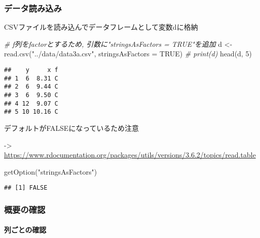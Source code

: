 \documentclass[
]{article}
\newenvironment{Shaded}{\begin{snugshade}}{\end{snugshade}}
\newcommand{\AttributeTok}[1]{\textcolor[rgb]{0.77,0.63,0.00}{#1}}
\newcommand{\CommentTok}[1]{\textcolor[rgb]{0.56,0.35,0.01}{\textit{#1}}}
\newcommand{\ConstantTok}[1]{\textcolor[rgb]{0.00,0.00,0.00}{#1}}
\newcommand{\DecValTok}[1]{\textcolor[rgb]{0.00,0.00,0.81}{#1}}
\newcommand{\FunctionTok}[1]{\textcolor[rgb]{0.00,0.00,0.00}{#1}}
\newcommand{\NormalTok}[1]{#1}
\newcommand{\OtherTok}[1]{\textcolor[rgb]{0.56,0.35,0.01}{#1}}
\newcommand{\StringTok}[1]{\textcolor[rgb]{0.31,0.60,0.02}{#1}}
\begin{document}
\hypertarget{ux30c7ux30fcux30bfux8aadux307fux8fbcux307f}{%
\subsubsection{データ読み込み}\label{ux30c7ux30fcux30bfux8aadux307fux8fbcux307f}}

CSVファイルを読み込んでデータフレームとして変数dに格納

\begin{Shaded}
\begin{Highlighting}[]
\CommentTok{\# f列をfactorとするため, 引数に"stringsAsFactors = TRUE"を追加}
\NormalTok{d }\OtherTok{\textless{}{-}} \FunctionTok{read.csv}\NormalTok{(}\StringTok{"../data/data3a.csv"}\NormalTok{, }\AttributeTok{stringsAsFactors =} \ConstantTok{TRUE}\NormalTok{)}
\CommentTok{\# print(d)}
\FunctionTok{head}\NormalTok{(d, }\DecValTok{5}\NormalTok{)}
\end{Highlighting}
\end{Shaded}

\begin{verbatim}
##    y     x f
## 1  6  8.31 C
## 2  6  9.44 C
## 3  6  9.50 C
## 4 12  9.07 C
## 5 10 10.16 C
\end{verbatim}

デフォルトがFALSEになっているため注意

-\textgreater{}
\url{https://www.rdocumentation.org/packages/utils/versions/3.6.2/topics/read.table}

\begin{Shaded}
\begin{Highlighting}[]
\FunctionTok{getOption}\NormalTok{(}\StringTok{"stringsAsFactors"}\NormalTok{) }
\end{Highlighting}
\end{Shaded}

\begin{verbatim}
## [1] FALSE
\end{verbatim}

\hypertarget{ux6982ux8981ux306eux78baux8a8d}{%
\subsubsection{概要の確認}\label{ux6982ux8981ux306eux78baux8a8d}}

\hypertarget{ux5217ux3054ux3068ux306eux78baux8a8d}{%
\paragraph{列ごとの確認}\label{ux5217ux3054ux3068ux306eux78baux8a8d}}
\end{document}
